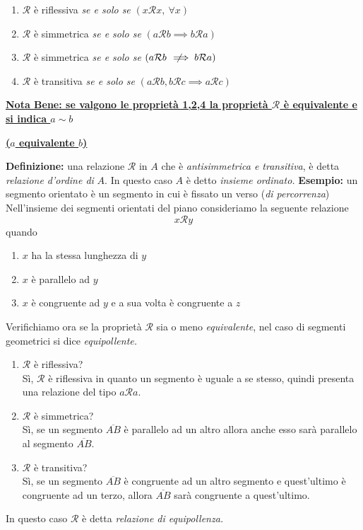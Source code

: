 \documentclass[a4paper]{article}
\newcommand{\nlongRightarrow}{\mkern12mu\not\mkern-10mu\implies}
\newcommand{\R}{\mathcal{R}}
\newcommand{\sss}{\textit{se e solo se }}
\newcommand{\n}{\par \noindent \newline}
\newcommand{\ns}{\par \noindent}
\begin{document}
\begin{enumerate}
	\item $\R$ è riflessiva \sss $(x\R x, \ \forall x)$
	\item $\R$ è simmetrica \sss $(a\R b \implies b\R a)$
	\item $\R$ è simmetrica \sss $(a\R b \nlongRightarrow b\R a)$
	\item $\R$ è transitiva \sss $(a\R b, b\R c \implies a\R c)$
\end{enumerate}
\n
\textbf{\underline{Nota Bene: se valgono le proprietà 1,2,4 la proprietà $\R$ è equivalente e si indica $a \sim b$}}\ns
\textbf{\underline{($a$ equivalente $b$)}}
\n
\textbf{Definizione: }una relazione $\R$ in $A$ che è \textit{antisimmetrica e transitiva}, è detta \textit{relazione d'ordine di }$A$. In questo caso $A$ è detto \textit{insieme ordinato.}
\textbf{Esempio: }un segmento orientato è un segmento in cui è fissato un verso (\textit{di percorrenza})
Nell'insieme dei segmenti orientati del piano consideriamo la seguente relazione
\begin{equation*}
	x\R y
\end{equation*}
quando
\begin{enumerate}
	\item $x$ ha la stessa lunghezza di $y$
	\item $x$ è parallelo ad $y$
	\item $x$ è congruente ad $y$ e a sua volta è congruente a $z$
\end{enumerate}
Verifichiamo ora se la proprietà $\R$ sia o meno \textit{equivalente}, nel caso di segmenti geometrici si dice \textit{equipollente.}

\begin{enumerate}
	\item $\R$ è riflessiva?\\
	Sì, $\R$ è riflessiva in quanto un segmento è uguale a se stesso, quindi presenta una relazione del tipo $a\R a$.
	\item $\R$ è simmetrica?\\
	Sì, se un segmento $\overline{AB}$ è parallelo ad un altro allora anche esso sarà parallelo al segmento $\overline{AB}$.
	\item $\R$ è transitiva?\\
	Sì, se un segmento $\overline{AB}$ è congruente ad un altro segmento e quest'ultimo è congruente ad un terzo, allora $\overline{AB}$ sarà congruente a quest'ultimo.
\end{enumerate}
In questo caso $\R$ è detta \textit{relazione di equipollenza.}
\end{document}
